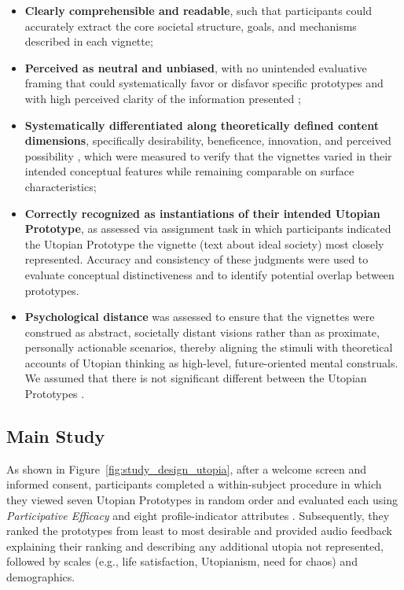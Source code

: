\documentclass[jou,floatsintext]{apa7}
\begin{document}
\begin{itemize}
    \item[$(a)$] \textbf{Clearly comprehensible and readable}, such that participants could accurately extract the core societal structure, goals, and mechanisms described in each vignette;
    \item[$(b)$]  \textbf{Perceived as neutral and unbiased}, with no unintended evaluative framing that could systematically favor or disfavor specific prototypes and with high perceived clarity of the information presented \parencite[questions adapted from][]{mercerPublicUnderstandingSolar2011};
    \item[$(c)$]  \textbf{Systematically differentiated along theoretically defined content dimensions}, specifically desirability, beneficence, innovation, and perceived possibility \parencite{lizzio-wilsonWhatCouldBe2025}, which were measured to verify that the vignettes varied in their intended conceptual features while remaining comparable on surface characteristics;
    \item[$(d)$]  \textbf{Correctly recognized as instantiations of their intended Utopian Prototype}, as assessed via assignment task in which participants indicated the Utopian Prototype the vignette (text about ideal society) most closely represented. Accuracy and consistency of these judgments were used to evaluate conceptual distinctiveness and to identify potential overlap between prototypes.
    
    \vspace{0.5cm}
    \item \textbf{Psychological distance} \parencite{tropeConstruallevelTheoryPsychological2010} was assessed to ensure that the vignettes were construed as abstract, societally distant visions rather than as proximate, personally actionable scenarios, thereby aligning the stimuli with theoretical accounts of Utopian thinking as high-level, future-oriented mental construals. We assumed that there is not significant different between the Utopian Prototypes \parencite[see p. 40f.][]{panayiotouImpossibleWorldsSocial2020}.
\end{itemize}



\subsection{Main Study}
\label{sec:mainstudy}


As shown in Figure~\ref{fig:study_design_utopia}, after a welcome screen and informed consent, participants completed a within-subject procedure in which they viewed seven Utopian Prototypes in random order and evaluated each using \textit{Participative Efficacy} \parencite{fernandoGreensSpaceInvaders2020} and eight profile-indicator attributes \parencite{lizzio-wilsonWhatCouldBe2025}. Subsequently, they ranked the prototypes from least to most desirable and provided audio feedback explaining their ranking and describing any additional utopia not represented, followed by scales  (e.g., life satisfaction, Utopianism, need for chaos) and demographics.
\end{document}
